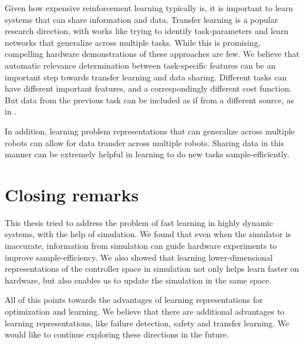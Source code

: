 Given how expensive reinforcement learning typically is, it is important to learn systems that can share information and data. Transfer learning is a popular research direction, with works like \cite{finn2017one} trying to identify task-parameters and learn networks that generalize across multiple tasks. While this is promising, compelling hardware demonstrations of these approaches are few. We believe that automatic relevance determination between task-specific features can be an important step towards transfer learning and data sharing. Different tasks can have different important features, and a correspondingly different cost function. But data from the previous task can be included as if from a different source, as in \cite{poloczek2016multi}. 

In addition, learning problem representations that can generalize across multiple robots can allow for
data transfer across multiple robots. Sharing data in this manner can be extremely helpful in learning to do new tasks sample-efficiently. 

\section{Closing remarks}

This thesis tried to address the problem of fast learning in highly dynamic systems, with the help of simulation. We found that even when the simulator is inaccurate, information from simulation can guide hardware experiments to improve sample-efficiency. We also showed that learning lower-dimensional representations of the controller space in simulation not only helps learn faster on hardware, but also enables us to update the simulation in the same space. 

All of this points towards the advantages of learning representations for optimization and learning. We believe that there are additional advantages to learning representations, like failure detection, safety and transfer learning. We would like to continue exploring these directions in the future.